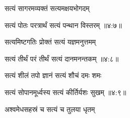 {\devanagarifont सत्यं सागरमव्यक्तं सत्यमक्षयभोगदम् \thinspace{\dandab} \dontdisplaylinenum }%


{\devanagarifont सत्यं पोतः परत्रार्थं सत्यं पन्थान विस्तरम् {॥४:७॥} \veg\dontdisplaylinenum }%

{\devanagarifont सत्यमिष्टगतिः प्रोक्तं सत्यं यज्ञमनुत्तमम् \thinspace{\dandab} \dontdisplaylinenum }%


{\devanagarifont सत्यं तीर्थं परं तीर्थं सत्यं दानमनन्तकम् {॥४:८॥} \veg\dontdisplaylinenum }%

{\devanagarifont सत्यं शीलं तपो ज्ञानं सत्यं शौचं दमः शमः \thinspace{\dandab} \dontdisplaylinenum }%


{\devanagarifont सत्यं सोपानमूर्ध्वस्य सत्यं कीर्तिर्यशः सुखम् {॥४:९॥} \veg\dontdisplaylinenum }%

{\devanagarifont अश्वमेधसहस्रं च सत्यं च तुलया धृतम् \thinspace{\dandab} \dontdisplaylinenum }%


